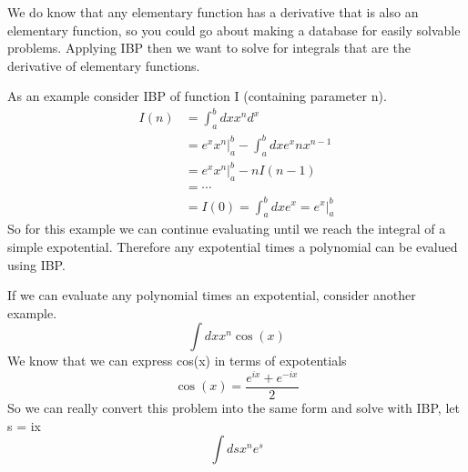 \documentclass{article}
\newcommand{\be}{\begin{equation}}
\newcommand{\ee}{\end{equation}}
\begin{document}
We do know that any elementary function has a derivative that is also an elementary function, so you could go about making a database for easily solvable problems. 
Applying IBP then we want to solve for integrals that are the derivative of elementary functions. 

As an example consider IBP of function I (containing parameter n). 
\be
\begin{split}
	I(n) &= \int_a^b dx x^n d^x\\
	&= e^x x^n \bigg |_a^b - \int_a^b dx e^x n x^{n-1} \\
	&= e^x x^n \bigg |_a^b - n I(n-1)\\
	&= \cdots \\
	&= I(0) = \int_a^b dx e^x = e^x \bigg |_a^b
\end{split}
\ee
So for this example we can continue evaluating until we reach the integral of a simple expotential.
Therefore any expotential times a polynomial can be evalued using IBP. 

If we can evaluate any polynomial times an expotential, consider another example.
\be
\int dx x^n \cos(x) 
\ee
We know that we can express cos(x) in terms of expotentials
\be
\cos(x) = \frac{e^{ix}+e^{-ix}}{2}
\ee
So we can really convert this problem into the same form and solve with IBP, let s = ix
\be
\int ds x^n e^s
\ee
\end{document}
